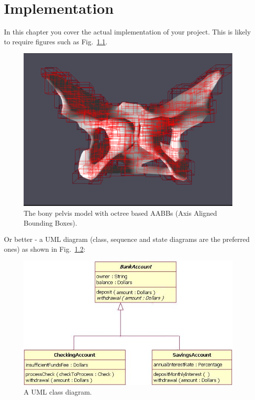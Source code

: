 \documentclass[a4paper, oneside, 11pt]{report}
\begin{document}
\chapter{Implementation}

In this chapter you cover the actual implementation of your project.
This is likely to require figures such as Fig.\ \ref{Pelvis_BVH}.

\begin{figure}[htb]
\includegraphics[width=1.0 \columnwidth]{pelvis_octree.png}
\caption{The bony pelvis model with octree based AABBs (Axis Aligned Bounding Boxes).}
\label{Pelvis_BVH}
\end{figure}

Or better - a UML diagram (class, sequence and state diagrams are the preferred ones) as shown in Fig.\ \ref{class}:

\begin{figure}[htb]
\includegraphics[width=1.0 \columnwidth]{class.png}
\caption{A UML class diagram.}
\label{class}
\end{figure}
\end{document}
